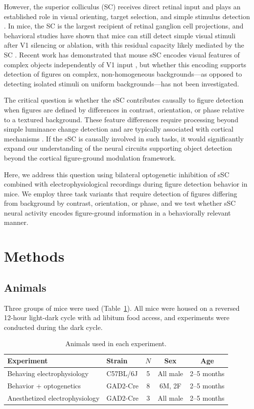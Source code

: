 \documentclass[12pt]{article}
\begin{document}
However, the superior colliculus (SC) receives direct retinal input and plays an established role in visual orienting, target selection, and simple stimulus detection \citep{schneider1969sc, dean1989sc}. In mice, the SC is the largest recipient of retinal ganglion cell projections, and behavioral studies have shown that mice can still detect simple visual stimuli after V1 silencing or ablation, with this residual capacity likely mediated by the SC \citep{feinberg2021v1, zhao2014sc}. Recent work has demonstrated that mouse sSC encodes visual features of complex objects independently of V1 input \citep{gale2014sc, wang2010sc}, but whether this encoding supports detection of figures on complex, non-homogeneous backgrounds---as opposed to detecting isolated stimuli on uniform backgrounds---has not been investigated.

The critical question is whether the sSC contributes causally to figure detection when figures are defined by differences in contrast, orientation, or phase relative to a textured background. These feature differences require processing beyond simple luminance change detection and are typically associated with cortical mechanisms \citep{lamme1995figure}. If the sSC is causally involved in such tasks, it would significantly expand our understanding of the neural circuits supporting object detection beyond the cortical figure-ground modulation framework.

Here, we address this question using bilateral optogenetic inhibition of sSC combined with electrophysiological recordings during figure detection behavior in mice. We employ three task variants that require detection of figures differing from background by contrast, orientation, or phase, and we test whether sSC neural activity encodes figure-ground information in a behaviorally relevant manner.

\section{Methods}

\subsection{Animals}

Three groups of mice were used (Table~\ref{tab:animals}). All mice were housed on a reversed 12-hour light-dark cycle with ad libitum food access, and experiments were conducted during the dark cycle.

\begin{table}[htbp]
\centering
\caption{Animals used in each experiment.}
\label{tab:animals}
\begin{tabular}{llccc}
\toprule
Experiment & Strain & $N$ & Sex & Age \\
\midrule
Behaving electrophysiology & C57BL/6J & 5 & All male & 2--5 months \\
Behavior + optogenetics & GAD2-Cre & 8 & 6M, 2F & 2--5 months \\
Anesthetized electrophysiology & GAD2-Cre & 3 & All male & 2--5 months \\
\bottomrule
\end{tabular}
\end{table}
\end{document}

